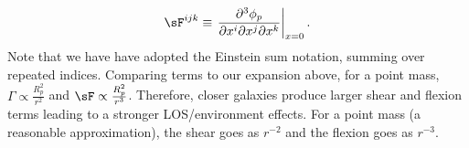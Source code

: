 \begin{equation}
\sF^{ijk} \equiv  \left. \frac{\partial^3 \phi_p}{\partial x^i \partial x^j \partial x^k} \right|_{x=0}.
\end{equation}
Note that we have have adopted the Einstein sum notation, summing over repeated indices. Comparing terms to our expansion above, for a point mass,
$\Gamma \propto \frac{R_p^2}{r^2}$ and $\sF \propto \frac{R_p^2}{r^3}$. Therefore, closer galaxies produce larger shear and flexion terms leading to a stronger LOS/environment effects. For a point mass (a reasonable approximation), the shear goes as $r^{-2}$ and the flexion goes as $r^{-3}$.